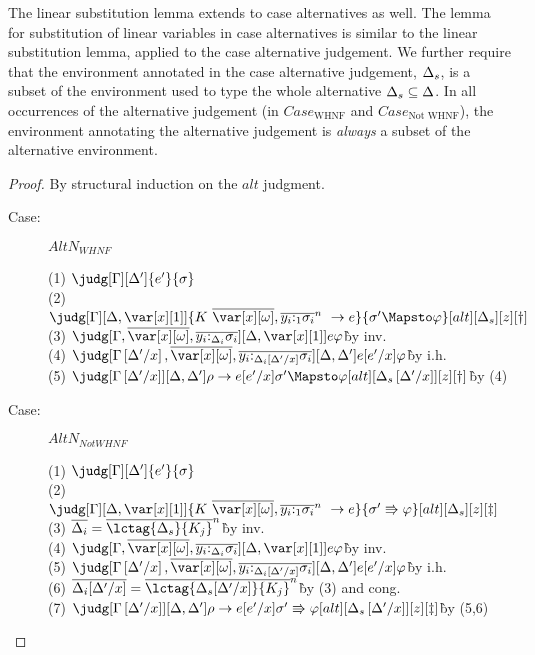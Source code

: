 The linear substitution lemma extends to case alternatives as well.
The lemma for substitution of linear variables in case alternatives is similar
to the linear substitution lemma, applied to the case alternative
judgement.
%
\LinearSubstitutionAltsLemma
%
\noindent We further require that the environment annotated in the case
alternative judgement, $\Delta_s$, is a subset of the environment used to type the
whole alternative $\Delta_s \subseteq \Delta$. In all occurrences of the alternative
judgement (in $Case_{\textrm{WHNF}}$ and $Case_{\textrm{Not WHNF}}$), the
environment annotating the alternative judgement is \emph{always} a subset of
the alternative environment.

\begin{proof}
By structural induction on the $alt$ judgment.

\begin{description}
\item[Case:] $AltN_{WHNF}$
\begin{tabbing}
    (1) $\judg[\G][\D']{e'}{\s}$\\
    (2) $\judg[\G][\D,\xl]{\konstructor~\to e}{\s' \Mapsto \vp}[alt][\D_s][z][\dag]$\\
    (3) $\judg[\G,\ov{\xo},\ov{y_i{:}_{\D_i}\s_i}][\D,\xl]{e}{\vp}$\`by inv.\\
    (4) $\judg[\subst{\G}{\D'}{x},\ov{\xo},\ov{y_i{:}_{\subst{\D_i}{\D'}{x}}\s_i}][\D,\D']{e[e'/x]}{\vp}$\` by i.h.\\
    (5) $\judg[\subst{\G}{\D'}{x}][\D,\D']{\rho \to e[e'/x]}{\s' \Mapsto \vp}[alt][\subst{\D_s}{\D'}{x}][z][\dag]$\` by (4)\\
\end{tabbing}

\item[Case:] $AltN_{Not WHNF}$
\begin{tabbing}
    (1) $\judg[\G][\D']{e'}{\s}$\\
    (2) $\judg[\G][\D,\xl]{\konstructor~\to e}{\s' \Rrightarrow \vp}[alt][\D_s][z][\ddag]$\\
    (3) $\ov{\D_i}=\ov{\lctag{\D_s}{K_j}}^n$\`by inv.\\
    (4) $\judg[\G,\ov{\xo},\ov{y_i{:}_{\D_i}\s_i}][\D,\xl]{e}{\vp}$\`by inv.\\
    (5) $\judg[\subst{\G}{\D'}{x},\ov{\xo},\ov{y_i{:}_{\subst{\D_i}{\D'}{x}}\s_i}][\D,\D']{e[e'/x]}{\vp}$\` by i.h.\\
    (6) $\ov{\D_i[\D'/x]}=\ov{\lctag{\D_s[\D'/x]}{K_j}}^n$\`by (3) and cong.\\
    (7) $\judg[\subst{\G}{\D'}{x}][\D,\D']{\rho \to e[e'/x]}{\s' \Rrightarrow \vp}[alt][\subst{\D_s}{\D'}{x}][z][\ddag]$\` by (5,6)\\
\end{tabbing}


\end{description}
\end{proof}
